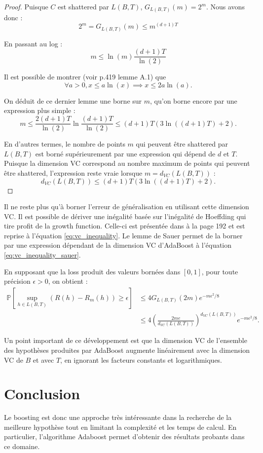 \documentclass[12pt]{article}
\begin{document}
\begin{proof}
	Puisque $C$ est shattered par $L(B, T)$, $G_{L(B, T)}(m) = 2^m$.
	Nous avons donc :
	\[
	2^m = G_{L(B, T)}(m) \leq m^{(d + 1) T}
	\]
	
	En passant au log :
	\[
	m \leq \ln(m) \frac{(d + 1) T}{\ln(2)}
	\]
	
	Il est possible de montrer (voir \cite{Shalev-Shwartz2014-ba} p.419 lemme A.1) que
	\[
	\forall a > 0, x \leq a \ln(x) \implies x \leq 2 a \ln(a).
	\]
	
	On déduit de ce dernier lemme une borne sur $m$, qu'on borne encore par une expression plus simple :
	\[
	m \leq \frac{2 (d + 1) T}{\ln(2)} \ln \frac{(d + 1) T}{\ln(2)} \leq (d + 1) T (3 \ln((d + 1) T) + 2).
	\]
	
	En d'autres termes, le nombre de points $m$ qui peuvent être shattered par $L(B, T)$ est borné supérieurement par une expression qui dépend de $d$ et $T$.
	Puisque la dimension VC correspond au nombre maximum de points qui peuvent être shattered, l'expression reste vraie lorsque $m = d_{VC}(L(B, T))$ :
	\[
	d_{VC}(L(B, T)) \leq (d + 1) T (3 \ln((d + 1) T) + 2).
	\]
	\end{proof}

	Il ne reste plus qu'à borner l'erreur de généralisation en utilisant cette dimension VC.
	Il est possible de dériver une inégalité basée sur l'inégalité de Hoeffding qui tire profit de la growth function.
	Celle-ci est présentée dans \cite{Bousquet2003-oz} à la page 192 et est reprise à l'équation \ref{eq:vc_inequality}.
	Le lemme de Sauer permet de la borner par une expression dépendant de la dimension VC d'AdaBoost à l'équation \ref{eq:vc_inequality_sauer}.
	
	En supposant que la loss produit des valeurs bornées dans $[0, 1]$, pour toute précision $\epsilon > 0$, on obtient :
	\begin{align}
	\mathbb{P}\left[ \sup_{h \in L(B, T)} (R(h) - R_m(h)) \geq \epsilon \right] &\leq 4 G_{L(B, T)}(2 m) e^{-m \epsilon^2 / 8} \label{eq:vc_inequality} \\
	&\leq 4 \left( \frac{2 m e}{d_{VC}(L(B, T))} \right)^{d_{VC}(L(B, T))} e^{-m \epsilon^2 / 8}. \label{eq:vc_inequality_sauer}
	\end{align}

	Un point important de ce développement est que la dimension VC de l'ensemble des hypothèses produites par AdaBoost augmente linéairement avec la dimension VC de $B$ et avec $T$, en ignorant les facteurs constants et logarithmiques.
	
	\section*{Conclusion}
	
	Le boosting est donc une approche très intéressante dans la recherche de la meilleure hypothèse tout en limitant la complexité et les temps de calcul. En particulier, l'algorithme Adaboost permet d'obtenir des résultats probants dans ce domaine. 	
	
	
	
	
\end{document}
